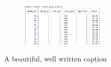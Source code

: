 \documentclass[12pt,a4paper]{article}
\begin{document}
\begin{figure}[h]
\begin{subfigure}{.5\textwidth}
		\end{subfigure}
		\begin{subfigure}{\textwidth}
			\raggedleft
			\includegraphics[width=0.45\textwidth]{past_orders}
		\end{subfigure}
		\caption[short]{A beautiful, well written caption}
	\end{figure}		    	
	    
	    

		

	\newpage
	\nocite{*}	
	
	
\end{document}
